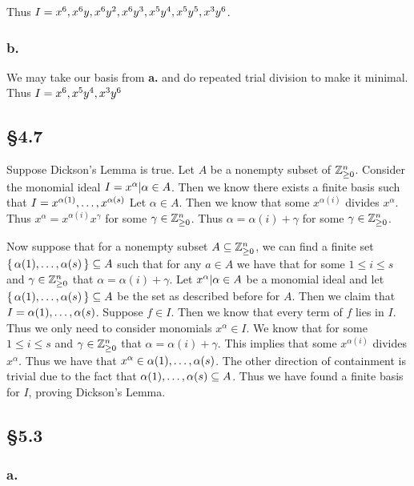\documentclass[letterpaper]{article}
\begin{document}
Thus $I = \gen{x^{6}, x^{6}y, x^{6}y^{2}, x^{6}y^{3}, x^{5}y^{4}, x^{5}y^{5}, x^{3}y^{6}}$.

\subsubsection*{b.}

We may take our basis from \textbf{a.} and do repeated trial division to make it minimal.
Thus $I = \gen{x^{6}, x^{5}y^{4}, x^{3}y^{6}}$

\subsection*{\S 4.7}

Suppose Dickson's Lemma is true.
Let $A$ be a nonempty subset of $\mathbb{Z}_{\geq 0}^{n}$.
Consider the monomial ideal $I = \gen{x^{\alpha} | \alpha \in A}$.
Then we know there exists a finite basis such that $I = \gen{x^{\alpha(1)}, \ldots, x^{\alpha(s)}}$ Let $\alpha \in A$.
Then we know that some $x^{\alpha(i)}$ divides $x^{\alpha}$.
Thus $x^{\alpha} = x^{\alpha(i)} x^{\gamma}$ for some $\gamma \in \mathbb{Z}_{\geq 0}^{n}$.
Thus $\alpha = \alpha(i) + \gamma$ for some $\gamma \in \mathbb{Z}_{\geq 0}^{n}$.

Now suppose that for a nonempty subset $A \subseteq \mathbb{Z}_{\geq 0}^{n}$, we can find a finite set $\set{\alpha(1), \ldots, \alpha(s)} \subseteq A$ such that for any $a \in A$ we have that for some $1 \leq i \leq s$ and $\gamma \in \mathbb{Z}_{\geq 0}^{n}$ that $\alpha = \alpha(i) + \gamma$.
Let $\gen{x^{\alpha} | \alpha \in A}$ be a monomial ideal and let $\set{\alpha(1), \ldots, \alpha(s)} \subseteq A$ be the set as described before for $A$.
Then we claim that $I = \gen{\alpha(1), \ldots, \alpha(s)}$.
Suppose $f \in I$.
Then we know that every term of $f$ lies in $I$.
Thus we only need to consider monomials $x^{\alpha} \in I$.
We know that for some $1 \leq i \leq s$ and $\gamma \in \mathbb{Z}_{\geq 0}^{n}$ that $\alpha = \alpha(i) + \gamma$.
This implies that some $x^{\alpha(i)}$ divides $x^{\alpha}$.
Thus we have that $x^{\alpha} \in \gen{\alpha(1), \ldots, \alpha(s)}$.
The other direction of containment is trivial due to the fact that $\gen{\alpha(1), \ldots, \alpha(s)} \subseteq A$.
Thus we have found a finite basis for $I$, proving Dickson's Lemma.

\subsection*{\S 5.3}

\subsubsection*{a.}
\end{document}
